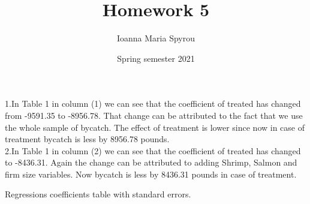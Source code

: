 \documentclass{article}
\title{Homework 5}
\author{Ioanna Maria Spyrou}
\date{Spring semester 2021}
\begin{document}
  
\maketitle


1.In Table 1 in column (1) we can see that the coefficient of treated has changed from -9591.35 to -8956.78. That change can be attributed to the fact that we use the whole sample of bycatch. The effect of treatment is lower since now in case of treatment bycatch is less by 8956.78 pounds. \\

2.In Table 1 in column (2) we can see that the coefficient of treated has changed to -8436.31. Again the change can be attributed to adding Shrimp, Salmon and firm size variables. Now bycatch is less by 8436.31 pounds in case of treatment.

\begin{table}[ht]
    \centering
    
    \caption{Regressions coefficients table with standard errors.}
    \label{tab:coeftable}
\end{table}
\end{document}
